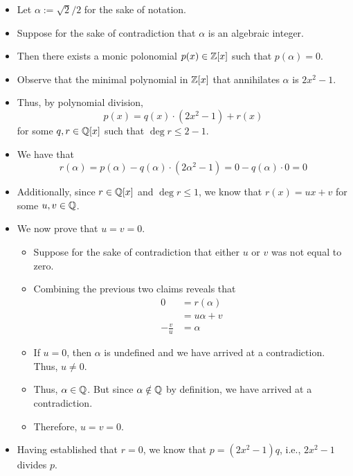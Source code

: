 \documentclass[../notes.tex]{subfiles}
\begin{document}
\begin{itemize}
    \begin{itemize}
        \item Let $\alpha:=\sqrt{2}/2$ for the sake of notation.
        \item Suppose for the sake of contradiction that $\alpha$ is an algebraic integer.
        \item Then there exists a monic polonomial $p(x)\in\mathbb{Z}[x]$ such that $p(\alpha)=0$.
        \item Observe that the minimal polynomial in $\mathbb{Z}[x]$ that annihilates $\alpha$ is $2x^2-1$.
        \item Thus, by polynomial division,
        \begin{equation*}
            p(x) = q(x)\cdot(2x^2-1)+r(x)
        \end{equation*}
        for some $q,r\in\mathbb{Q}[x]$ such that $\deg r\leq 2-1$.
        \item We have that
        \begin{equation*}
            r(\alpha) = p(\alpha)-q(\alpha)\cdot(2\alpha^2-1)
            = 0-q(\alpha)\cdot 0
            = 0
        \end{equation*}
        \item Additionally, since $r\in\mathbb{Q}[x]$ and $\deg r\leq 1$, we know that $r(x)=ux+v$ for some $u,v\in\mathbb{Q}$.
        \item We now prove that $u=v=0$.
        \begin{itemize}
            \item Suppose for the sake of contradiction that either $u$ or $v$ was not equal to zero.
            \item Combining the previous two claims reveals that
            \begin{align*}
                0 &= r(\alpha)\\
                &= u\alpha+v\\
                -\frac{v}{u} &= \alpha
            \end{align*}
            \item If $u=0$, then $\alpha$ is undefined and we have arrived at a contradiction. Thus, $u\neq 0$.
            \item Thus, $\alpha\in\mathbb{Q}$. But since $\alpha\notin\mathbb{Q}$ by definition, we have arrived at a contradiction.
            \item Therefore, $u=v=0$.
        \end{itemize}
        \item Having established that $r=0$, we know that $p=(2x^2-1)q$, i.e., $2x^2-1$ divides $p$.

\end{itemize}
\end{itemize}
\end{document}
